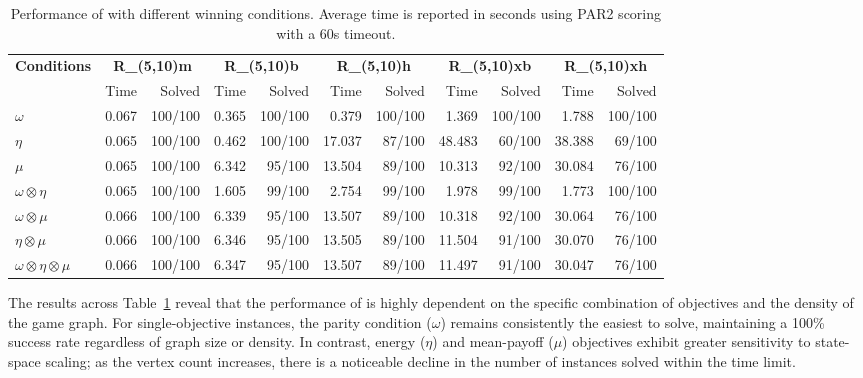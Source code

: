 \documentclass[a4paper,UKenglish,cleveref, autoref, thm-restate, anonymous]{lipics-v2021}
\begin{document}
\vspace{-8pt}
\begin{table}[ht]
\centering
\caption{Performance of \nocq with different winning conditions. Average time is reported in seconds using PAR2 scoring with a 60s timeout.}
\setlength{\tabcolsep}{0.9mm} %
{\small 
\begin{tabular}{l|rr|rr|rr|rr|rr}
\toprule
\textbf{Conditions} & \multicolumn{2}{c|}{\textbf{R\_(5,10)m}} & \multicolumn{2}{c|}{\textbf{R\_(5,10)b}} & \multicolumn{2}{c|}{\textbf{R\_(5,10)h}} & \multicolumn{2}{c|}{\textbf{R\_(5,10)xb}} & \multicolumn{2}{c}{\textbf{R\_(5,10)xh}} \\
& Time & Solved & Time & Solved & Time & Solved & Time & Solved & Time & Solved \\
\midrule
\textbf{$\omega$}
    & 0.067 & 100/100 & 0.365 & 100/100 & 0.379 & 100/100 & 1.369 & 100/100 & 1.788 & 100/100 \\
\textbf{$\eta$}
    & 0.065 & 100/100 & 0.462 & 100/100 & 17.037 & 87/100 & 48.483 & 60/100 & 38.388 & 69/100 \\
\textbf{$\mu$}
    & 0.065 & 100/100 & 6.342 & 95/100 & 13.504 & 89/100 & 10.313 & 92/100 & 30.084 & 76/100 \\
\textbf{$\omega \otimes \eta$}
    & 0.065 & 100/100 & 1.605 & 99/100 & 2.754 & 99/100 & 1.978 & 99/100 & 1.773 & 100/100 \\
\textbf{$\omega \otimes \mu$}
    & 0.066 & 100/100 & 6.339 & 95/100 & 13.507 & 89/100 & 10.318 & 92/100 & 30.064 & 76/100 \\
\textbf{$\eta \otimes \mu$}
    & 0.066 & 100/100 & 6.346 & 95/100 & 13.505 & 89/100 & 11.504 & 91/100 & 30.070 & 76/100 \\
\textbf{$\omega \otimes \eta \otimes \mu$}
    & 0.066 & 100/100 & 6.347 & 95/100 & 13.507 & 89/100 & 11.497 & 91/100 & 30.047 & 76/100 \\
\bottomrule
\end{tabular}
}
\label{tab:quantitative}
\end{table}
\vspace{-5pt}

The results across Table~\ref{tab:quantitative} reveal that the performance of \nocq is highly dependent on the specific combination of objectives and the density of the game graph. For single-objective instances, the parity condition ($\omega$) remains consistently the easiest to solve, maintaining a 100\% success rate regardless of graph size or density. In contrast, energy ($\eta$) and mean-payoff ($\mu$) objectives exhibit greater sensitivity to state-space scaling; as the vertex count increases, there is a noticeable decline in the number of instances solved within the time limit.
\end{document}
